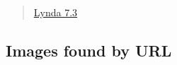 \documentclass[]{article}
\begin{document}
\begin{quote}
\href{https://www.lynda.com/RStudio-tutorials/Inserting-images-using-raw-LaTeX/699348/2800217-4.html?srchtrk=index\%3a1\%0alinktypeid\%3a2\%0aq\%3ar+markdown\%0apage\%3a1\%0as\%3arelevance\%0asa\%3atrue\%0aproducttypeid\%3a2}{Lynda
7.3}
\end{quote}

\hypertarget{images-found-by-url}{%
\subsection{Images found by URL}\label{images-found-by-url}}
\end{document}
